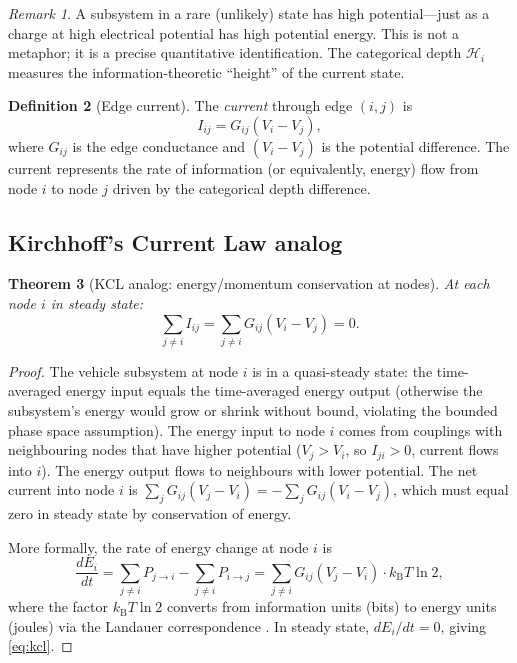 \documentclass[twocolumn,10pt,a4paper]{article}
\newtheorem{theorem}{Theorem}[section]
\theoremstyle{definition}
\newtheorem{definition}[theorem]{Definition}
\theoremstyle{remark}
\newtheorem{remark}[theorem]{Remark}
\newcommand{\kB}{k_{\mathrm{B}}}
\begin{document}
\begin{remark}
A subsystem in a rare (unlikely) state has high potential---just as a charge at high electrical potential has high potential energy. This is not a metaphor; it is a precise quantitative identification. The categorical depth $\mathcal{H}_i$ measures the information-theoretic ``height'' of the current state.
\end{remark}

\begin{definition}[Edge current]\label{def:edge_current}
The \emph{current} through edge $(i, j)$ is
\begin{equation}\label{eq:edge_current}
I_{ij} = G_{ij} (V_i - V_j),
\end{equation}
where $G_{ij}$ is the edge conductance and $(V_i - V_j)$ is the potential difference. The current represents the rate of information (or equivalently, energy) flow from node $i$ to node $j$ driven by the categorical depth difference.
\end{definition}

\subsection{Kirchhoff's Current Law analog}

\begin{theorem}[KCL analog: energy/momentum conservation at nodes]\label{thm:kcl}
At each node $i$ in steady state:
\begin{equation}\label{eq:kcl}
\sum_{j \neq i} I_{ij} = \sum_{j \neq i} G_{ij}(V_i - V_j) = 0.
\end{equation}
\end{theorem}

\begin{proof}
The vehicle subsystem at node $i$ is in a quasi-steady state: the time-averaged energy input equals the time-averaged energy output (otherwise the subsystem's energy would grow or shrink without bound, violating the bounded phase space assumption). The energy input to node $i$ comes from couplings with neighbouring nodes that have higher potential ($V_j > V_i$, so $I_{ji} > 0$, current flows into $i$). The energy output flows to neighbours with lower potential. The net current into node $i$ is $\sum_{j} G_{ij}(V_j - V_i) = -\sum_j G_{ij}(V_i - V_j)$, which must equal zero in steady state by conservation of energy.

More formally, the rate of energy change at node $i$ is
\begin{equation}
\frac{dE_i}{dt} = \sum_{j \neq i} P_{j \to i} - \sum_{j \neq i} P_{i \to j} = \sum_{j \neq i} G_{ij}(V_j - V_i) \cdot \kB T \ln 2,
\end{equation}
where the factor $\kB T \ln 2$ converts from information units (bits) to energy units (joules) via the Landauer correspondence \citep{Landauer1961}. In steady state, $dE_i/dt = 0$, giving \eqref{eq:kcl}.
\end{proof}
\end{document}
